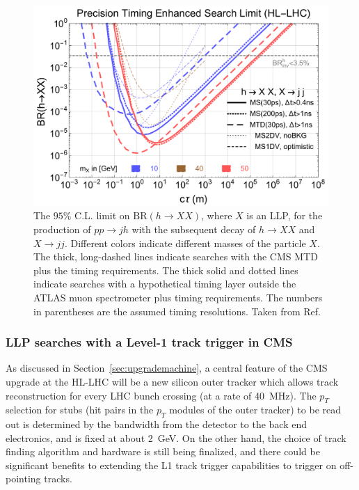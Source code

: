 \begin{figure}[ht]
    \centering
    \includegraphics[width=1.0\columnwidth]{figures/MTD/10-20-50-MC-Lcalc-BRlimit-with-deltaT-cut-MS-1ns.pdf}
    \caption{The $95\%$ C.L. limit on $\text{BR}(h \to XX)$, where $X$ is an LLP, for the production of $pp \to j h$ with the subsequent decay of $h\to X X$ and $X \to j j$. Different colors indicate different masses of the particle $X$. The thick, long-dashed lines indicate searches with the CMS MTD plus the timing requirements. The thick solid and dotted lines indicate searches with a hypothetical timing layer outside the ATLAS muon spectrometer plus timing requirements. The numbers in parentheses are the assumed timing resolutions. Taken from Ref.~\cite{Liu:2018wte}}
    \label{fig:ctaulimitHiggs}
\end{figure}

\subsubsection{LLP searches with a Level-1 track trigger in CMS}

As discussed in Section~\ref{sec:upgrademachine}, a central feature of the CMS upgrade at the HL-LHC will be a new silicon outer tracker which allows track reconstruction for every LHC bunch crossing (at a rate of 40~MHz). The $p_T$ selection for stubs (hit pairs in the $p_T$ modules of the outer tracker) to be read out is determined by the bandwidth from the detector to the back end electronics, and is fixed at about 2~GeV. On the other hand, the choice of track finding algorithm and hardware is still being finalized, and there could be significant benefits to extending the L1 track trigger capabilities to trigger on off-pointing tracks.

